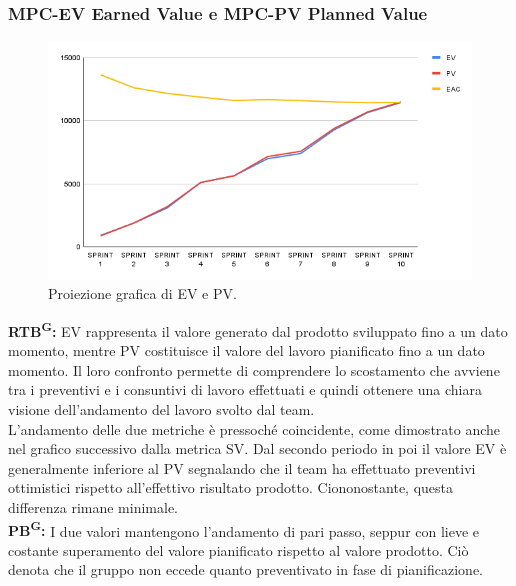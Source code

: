 \documentclass[8pt]{article}
\newcommand{\glossterm}[1]{#1\textsuperscript{G}} %
\begin{document}
\subsubsection{MPC-EV Earned Value e MPC-PV Planned Value}
\begin{figure}[h!]
    \centering
    \includegraphics[width=1\textwidth]{images_pdq/EV_PV.png}
    \caption{Proiezione grafica di EV e PV.}
    \label{fig:Proiezione grafica di EV e PV}
\end{figure}
\textbf{\glossterm{RTB}:} EV rappresenta il valore generato dal prodotto sviluppato fino a un dato momento, mentre PV costituisce il valore del lavoro pianificato fino a un dato momento. Il loro confronto permette di comprendere lo scostamento che avviene tra i preventivi e i consuntivi di lavoro effettuati e quindi ottenere una chiara visione dell'andamento del lavoro svolto dal team.\\
L'andamento delle due metriche è pressoché coincidente, come dimostrato anche nel grafico successivo dalla metrica SV. Dal secondo periodo in poi il valore EV è generalmente inferiore al PV segnalando che il team ha effettuato preventivi ottimistici rispetto all'effettivo risultato prodotto. Ciononostante, questa differenza rimane minimale.\\
\textbf{\glossterm{PB}:} I due valori mantengono l'andamento di pari passo, seppur con lieve e costante superamento del valore pianificato rispetto al valore prodotto. Ciò denota che il gruppo non eccede quanto preventivato in fase di pianificazione.
\clearpage
\end{document}
